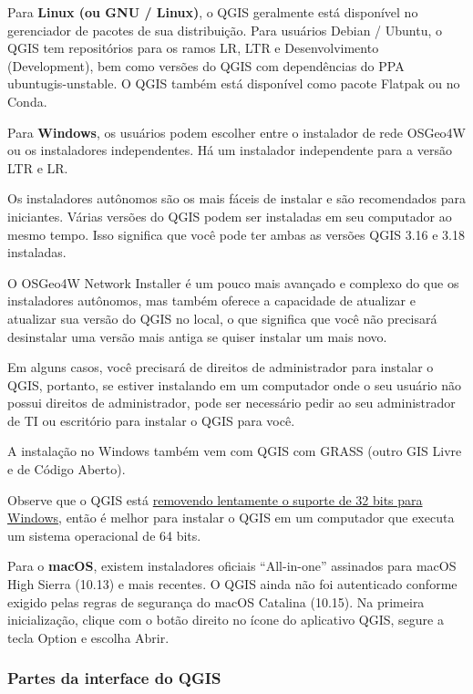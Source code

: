\documentclass[
]{book}
\begin{document}
Para \textbf{Linux (ou GNU / Linux)}, o QGIS geralmente está disponível no gerenciador de pacotes de sua distribuição. Para usuários Debian / Ubuntu, o QGIS tem repositórios para os ramos LR, LTR e Desenvolvimento (Development), bem como versões do QGIS com dependências do PPA ubuntugis-unstable. O QGIS também está disponível como pacote Flatpak ou no Conda.

Para \textbf{Windows}, os usuários podem escolher entre o instalador de rede OSGeo4W ou os instaladores independentes. Há um instalador independente para a versão LTR e LR.

Os instaladores autônomos são os mais fáceis de instalar e são recomendados para iniciantes. Várias versões do QGIS podem ser instaladas em seu computador ao mesmo tempo. Isso significa que você pode ter ambas as versões QGIS 3.16 e 3.18 instaladas.

O OSGeo4W Network Installer é um pouco mais avançado e complexo do que os instaladores autônomos, mas também oferece a capacidade de atualizar e atualizar sua versão do QGIS no local, o que significa que você não precisará desinstalar uma versão mais antiga se quiser instalar um mais novo.

Em alguns casos, você precisará de direitos de administrador para instalar o QGIS, portanto, se estiver instalando em um computador onde o seu usuário não possui direitos de administrador, pode ser necessário pedir ao seu administrador de TI ou escritório para instalar o QGIS para você.

A instalação no Windows também vem com QGIS com GRASS (outro GIS Livre e de Código Aberto).

Observe que o QGIS está \href{https://blog.qgis.org/2020/10/15/phasing-out-32-bit-support-in-qgis/}{removendo lentamente o suporte de 32 bits para Windows}, então é melhor para instalar o QGIS em um computador que executa um sistema operacional de 64 bits.

Para o \textbf{macOS}, existem instaladores oficiais ``All-in-one'' assinados para macOS High Sierra (10.13) e mais recentes. O QGIS ainda não foi autenticado conforme exigido pelas regras de segurança do macOS Catalina (10.15). Na primeira inicialização, clique com o botão direito no ícone do aplicativo QGIS, segure a tecla Option e escolha Abrir.

\hypertarget{partes-da-interface-do-qgis}{%
\subsubsection{\texorpdfstring{\textbf{Partes da interface do QGIS}}{Partes da interface do QGIS}}\label{partes-da-interface-do-qgis}}
\end{document}
